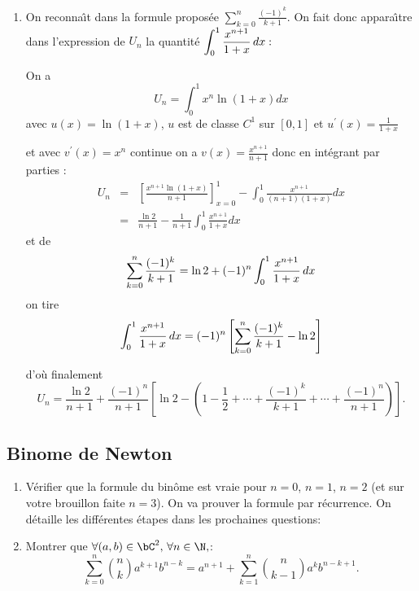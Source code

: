 \begin{correction}
\begin{enumerate}
\begin{enumerate}
\item On reconna\^{\i}t dans la formule propos\'{e}e $\displaystyle%
\sum_{k=0}^{n}\frac{(-1)^{k}}{k+1}$. On fait donc appara\^{\i}tre dans
l'expression de $U_{n}$ la quantit\'{e} $\displaystyle\int_{0}^{1}\frac{%
x^{n+1}}{1+x}\,dx:$

On a 
\begin{equation*}
U_{n}=\int_{0}^{1}x^{n}\ln \left( 1+x\right) dx
\end{equation*}
avec $u\left( x\right) =\ln \left( 1+x\right) $, $u$ est de classe $C^{1}$
sur $\left[ 0,1\right] $ et $u^{\prime }\left( x\right) =\displaystyle
\frac{1}{1+x}$

et avec $v^{\prime }\left( x\right) =x^{n}$ continue on a $v\left( x\right) =%
\displaystyle
\frac{x^{n+1}}{n+1}$ donc en int\'{e}grant par parties : 
\begin{eqnarray*}
U_{n} &=&\left[ \frac{x^{n+1}\ln \left( 1+x\right) }{n+1}\right]
_{x=0}^{1}-\int_{0}^{1}\frac{x^{n+1}}{\left( n+1\right) \left( 1+x\right) }dx
\\
&=&\frac{\ln 2}{n+1}-\frac{1}{n+1}\int_{0}^{1}\frac{x^{n+1}}{1+x}dx
\end{eqnarray*}
et de 
\begin{equation*}
\sum_{k=0}^{n}\frac{(-1)^{k}}{k+1}=\ln 2+(-1)^{n}\int_{0}^{1}\frac{x^{n+1}}{%
1+x}\,dx
\end{equation*}
on tire 
\begin{equation*}
\int_{0}^{1}\frac{x^{n+1}}{1+x}\,dx=(-1)^{n}\left[ \sum_{k=0}^{n}\frac{%
(-1)^{k}}{k+1}-\ln 2\right]
\end{equation*}

d'o\`{u} finalement 
\begin{equation*}
U_{n}=\frac{\ln 2}{n+1}+\frac{(-1)^{n}}{n+1}\left[ \ln 2-\left( 1-\frac{1}{2}%
+\cdots +\frac{(-1)^{k}}{k+1}+\cdots +\frac{(-1)^{n}}{n+1}\right) \right] .
\end{equation*}
\end{enumerate}

\end{enumerate}






\subsection{Binome de Newton}


\begin{exercice}


\begin{enumerate}
\item Vérifier que la formule du binôme est vraie pour $n=0$, $n=1$, $n=2$ (et sur votre brouillon faite $n=3$).
On va prouver la formule par récurrence. On détaille les différentes étapes dans les prochaines questions: 
\item Montrer que $\forall (a,b)\in \bC^2,\,  \forall n \in \N, $:
$$\sum_{k=0}^n \binom{n}{k}a^{k+1} b^{n-k} = a^{n+1}+\sum_{k=1}^{n} \binom{n}{k-1}a^{k} b^{n-k+1}.$$



\end{enumerate}
\end{exercice}
\end{correction}
